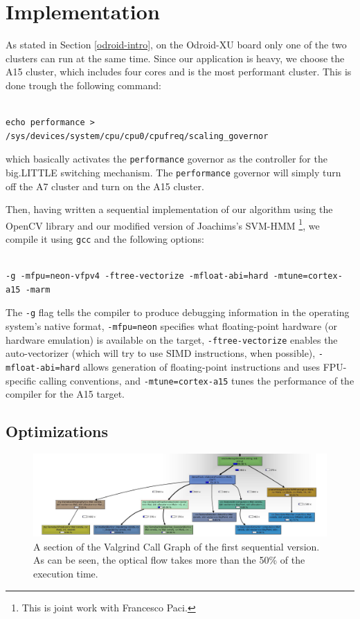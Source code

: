 \section{Implementation}
\lstset{language=C++}

As stated in Section \ref{odroid-intro}, on the Odroid-XU board only one of the two clusters can run at the same time. Since our application is heavy, we choose the A15 cluster, which includes four cores and is the most performant cluster. This is done trough the following command:
\begin{lstlisting}[frame=single]  % Start your code-block

echo performance > /sys/devices/system/cpu/cpu0/cpufreq/scaling_governor
\end{lstlisting}
which basically activates the \verb+performance+ governor as the controller for the big.LITTLE switching mechanism. The \verb+performance+ governor will simply turn off the A7 cluster and turn on the A15 cluster.

Then, having written a sequential implementation of our algorithm using the OpenCV library and our modified version of Joachims's SVM-HMM \cite{joachims} \footnote{This is joint work with Francesco Paci.}, we compile it using \verb+gcc+ and the following options:
\begin{lstlisting}[frame=single]  % Start your code-block

-g -mfpu=neon-vfpv4 -ftree-vectorize -mfloat-abi=hard -mtune=cortex-a15 -marm
\end{lstlisting}

The \verb+-g+ flag tells the compiler to produce debugging information in the operating system's native format, \verb+-mfpu=neon+  specifies what floating-point hardware (or hardware emulation) is available on the target, \verb+-ftree-vectorize+ enables the auto-vectorizer (which will try to use SIMD instructions, when possible), \verb+-mfloat-abi=hard+ allows generation of floating-point instructions and uses FPU-specific calling conventions, and \verb+-mtune=cortex-a15+ tunes the performance of the compiler for the A15 target.

\subsection{Optimizations}
\begin{figure}[t!]
\centering
\includegraphics[width=1.5\linewidth,angle=90]{Figures/grafico_prestazioni.jpg}
\caption{A section of the Valgrind Call Graph of the first sequential version. As can be seen, the optical flow takes more than the 50\% of the execution time.}
\label{valgrind}
\end{figure}

